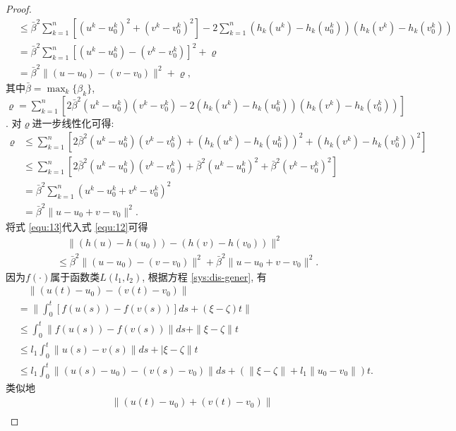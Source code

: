 \begin{proof}
\begin{align}
            \nonumber &\leq \bar{\beta}^2\sum^n_{k=1}[ (u^k-u^k_0)^2+(v^k-v^k_0)^2]
            -2\sum^n_{k=1}(h_k(u^k)-h_k(u^k_0))(h_k(v^k)-h_k(v^k_0))\\
            \nonumber &=\bar{\beta}^2\sum^n_{k=1}[(u^k-u^k_0)-(v^k-v^k_0)]^2+\varrho\\
            &=\bar{\beta}^2\|(u-u_0)-(v-v_0)\|^2+\varrho,
            \end{align}
           其中$\bar{\beta}=\max_k\{\beta_k\}$, $\varrho=\sum^n_{k=1}[2\bar{\beta}^2(u^k-u^k_0)(v^k-v^k_0)-2(h_k(u^k)-h_k(u^k_0))(h_k(v^k)-h_k(v^k_0))]$.
            对$\varrho$进一步线性化可得:
            \begin{align}\label{equ:13}
            \nonumber \varrho&\leq\sum^n_{k=1}[2\bar{\beta}^2(u^k-u^k_0)(v^k-v^k_0)+(h_k(u^k)-h_k(u^k_0))^2+(h_k(v^k)-h_k(v^k_0))^2]\\
            \nonumber &\leq\sum^n_{k=1}[2\bar{\beta}^2(u^k-u^k_0)(v^k-v^k_0)+\bar{\beta}^2(u^k-u^k_0)^2+\bar{\beta}^2(v^k-v^k_0)^2]\\
            \nonumber &=\bar{\beta}^2\sum^n_{k=1}(u^k-u^k_0+v^k-v^k_0)^2\\
            &=\bar{\beta}^2\| u-u_0+v-v_0 \|^2.
            \end{align}
        将式 \eqref{equ:13}代入式 \eqref{equ:12}可得
            \begin{align}\label{equ:up1}
            \nonumber &\quad\|(h(u)-h(u_0))-(h(v)-h(v_0))\|^2\\
            &\leq\bar{\beta}^2\|(u-u_0)-(v-v_0)\|^2+\bar{\beta}^2\| u-u_0+v-v_0 \|^2.
            \end{align}
        因为$f(\cdot)$属于函数类$L(l_{1},l_{2})$, 根据方程 \eqref{sys:dis-gener}, 有
            \begin{align}\label{equ:up2}
            \nonumber &\quad\|(u(t)-u_0)-(v(t)-v_0)\|\\
            \nonumber &=\|\int^t_0[f(u(s))-f(v(s))]ds+(\xi-\zeta)t\|\\
            \nonumber &\leq\int^t_0\|f(u(s))-f(v(s))\|ds+\|\xi-\zeta\|t\\
            \nonumber &\leq l_1\int^t_0\|u(s)-v(s)\|ds+|\xi-\zeta\|t\\
             &\leq l_1\int^t_0\|(u(s)-u_0)-(v(s)-v_0)\|ds+(\|\xi-\zeta\|+l_1\|u_0-v_0\|)t.
            \end{align}
        类似地
            \begin{align}\label{equ:up3}
            \nonumber &\quad\| (u(t)-u_0)+(v(t)-v_0)\|\\

\end{align}
\end{proof}
